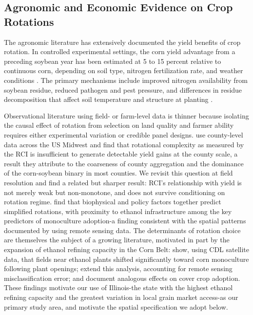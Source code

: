 \documentclass[12pt,letterpaper]{article}
\theoremstyle{remark}
\theoremstyle{remark}
\theoremstyle{plain}
\theoremstyle{definition}
\begin{document}
\subsection{\label{subsec:agronomy}Agronomic and Economic Evidence on Crop Rotations}

The agronomic literature has extensively documented the yield benefits of crop rotation. In controlled experimental settings, the corn yield advantage from a preceding soybean year has been estimated at 5 to 15 percent relative to continuous
corn, depending on soil type, nitrogen fertilization rate, and weather conditions \citep{Gentry2013, Farmaha2016}. The primary mechanisms include improved nitrogen availability from soybean residue, reduced pathogen and pest pressure, and differences in residue decomposition that affect soil temperature and structure at planting \citep{Gentry2013}.

Observational literature using field- or farm-level data is thinner because isolating the causal effect of rotation from selection on land quality and farmer ability requires either experimental variation or credible panel designs. \citet{burchfield2024} use county-level data across the US Midwest and find that rotational complexity as measured by the RCI is insufficient to generate detectable yield gains at the county scale, a result they attribute to the coarseness of county aggregation and the dominance of the corn-soybean binary in most counties. We revisit this question at field resolution and find a related but sharper result: RCI's relationship with yield is not merely weak but non-monotone, and does not survive conditioning on rotation regime. \citet{socolar2021} find that biophysical and policy factors together predict simplified rotations, with proximity to ethanol infrastructure among the key predictors of monoculture adoption-a finding consistent with the spatial patterns documented by \citet{pates2021} using remote sensing data. The determinants of rotation choice are themselves the subject of a growing literature, motivated in part by the expansion of ethanol refining capacity in the Corn Belt: \citet{pates2021} show, using CDL satellite data, that fields near ethanol plants shifted significantly toward corn monoculture following plant openings; \citet{Pates2025} extend this analysis, accounting for remote sensing misclassification error; and \citet{cheu2025} document analogous effects on cover crop adoption. These findings motivate our use of Illinois-the state with the highest ethanol refining capacity and the greatest variation in local grain market access-as our primary study area, and motivate the spatial specification we adopt below.
\end{document}
